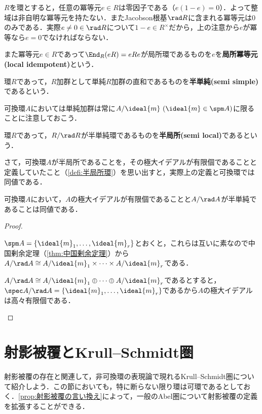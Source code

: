 $R$を環とすると，任意の冪等元$e\in R$は零因子である（$e(1-e)=0$）．よって整域は非自明な冪等元を持たない．またJacobson根基$\rad R$に含まれる冪等元は$0$のみである．実際$e\neq 0\in\rad R$について$1-e\in R^\times$だから，上の注意から$e$が冪等なら$e=0$でなければならない．

また冪等元$e\in R$であって$\End_R(eR)=eRe$が局所環であるものを$e$を\textbf{局所冪等元(local idempotent)}という．

\begin{defi}[半単純環]
	環$R$であって，$R$加群として単純$R$加群の直和であるものを\textbf{半単純(semi simple)}であるという．
\end{defi}

可換環$A$においては単純加群は常に$A/\ideal{m}~(\ideal{m}\in\spm A)$に限ることに注意しておこう．

\begin{defi}[半局所環]
	環$R$であって，$R/\rad R$が半単純環であるものを\textbf{半局所(semi local)}であるという．
\end{defi}

さて，可換環$A$が半局所であることを，その極大イデアルが有限個であることと定義していたこと（\ref{defi:半局所環}）を思い出すと，実際上の定義と可換環では同値である．

\begin{prop}
	可換環$A$において，$A$の極大イデアルが有限個であることと$A/\rad A$が半単純であることは同値である．
\end{prop}

\begin{proof}
	\begin{eqv}
		\item $\spm A=\{\ideal{m}_1,\dots,\ideal{m}_r\}$とおくと，これらは互いに素なので中国剰余定理（\ref{thm:中国剰余定理}）から$A/\rad A\cong A/\ideal{m}_1\times\dots\times A/\ideal{m}_r$である．
		\item $A/\rad A\cong A/\ideal{m}_1\oplus\dots\oplus A/\ideal{m}_r$であるとすると，$\spec A/\rad A=\{\ideal{m}_1,\dots,\ideal{m}_r\}$であるから$A$の極大イデアルは高々有限個である．
	\end{eqv}
\end{proof}

\section{射影被覆とKrull--Schmidt圏}

射影被覆の存在と関連して，非可換環の表現論で現れるKrull--Schmidt圏について紹介しよう．この節においても，特に断らない限り環は可環であるとしておく．\ref{prop:射影被覆の言い換え}によって，一般のAbel圏について射影被覆の定義を拡張することができる．

